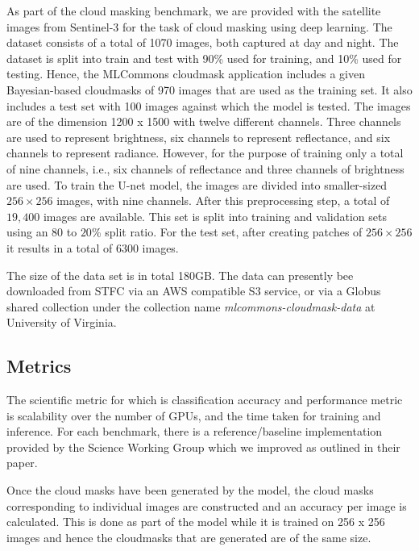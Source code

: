 \documentclass[sigplan,screen]{acmart}
\begin{document}
As part of the cloud masking benchmark, we are provided with the satellite images from Sentinel-3 \cite{www-sentinal-3} for the task of cloud masking using deep learning. 
The dataset consists of a total of 1070 images, both captured at day and night. The dataset is split into train and test with 90\% used for training, and 10\% used for testing. 
Hence, the MLCommons cloudmask application includes a given Bayesian-based cloudmasks of 970 images that are used as the training set. It also includes a test set with 100 images against which the model is tested. 
The images are of the dimension 1200 x 1500 with twelve different channels. Three channels are used to represent brightness, six channels to represent reflectance, and six channels to represent radiance. However, for the purpose of training only a total of nine channels, i.e., six channels of reflectance and three channels of brightness are used.  
To train the U-net model, the images are divided into smaller-sized $256 \times 256$ images, with nine channels. After this preprocessing step, a total of $19,400$ images are available. This set is split into training and validation sets using an $80$ to $20$\% split ratio. For the test set, after creating patches of $256 \times 256$ it results in a total of $6300$ images. 

The size of the data set is in total 180GB. The data can presently bee downloaded from STFC via an AWS compatible S3 service, or via a Globus shared collection under the collection name {\em mlcommons-cloudmask-data} at University of Virginia.



\subsection {Metrics}

The scientific metric for which is classification accuracy and performance metric is scalability over the number of GPUs, and the time taken for training and inference. 
For each benchmark, there is a reference/baseline implementation provided by the Science Working Group which we improved as outlined in their paper.



Once the cloud masks have been generated by the model, the cloud masks corresponding to individual images are constructed and an accuracy per image is calculated. This is done as part of the model while it is trained on 256 x 256 images and hence the cloudmasks that are generated are of the same size. 
\end{document}
